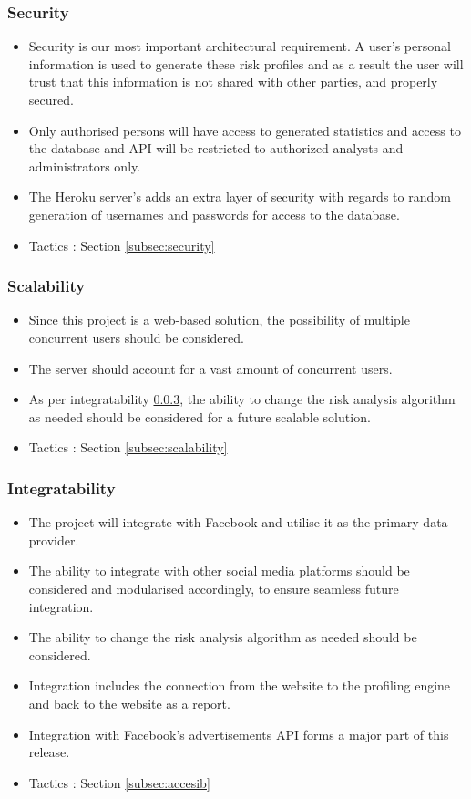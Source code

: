\documentclass{article}
\begin{document}
		\subsubsection{Security}\label{subsubsec:security}
		\begin{itemize}
			\item Security is our most important architectural requirement. A user's personal information is used to generate these risk profiles and as a result the user will trust that this information is not shared with other parties, and properly secured.
			\item Only authorised persons will have access to generated statistics and access to the database and API will be restricted to authorized analysts and administrators only.
			\item The Heroku server's adds an extra layer of security with regards to random generation of usernames and passwords for access to the database.
			\item Tactics : Section \ref{subsec:security}
		\end{itemize}
		\subsubsection{Scalability}
		\begin{itemize}
			\item Since this project is a web-based solution, the possibility of multiple concurrent users should be considered.
			\item The server should account for a vast amount of concurrent users.
			\item As per integratability \ref{subsubsec:integratability}, the ability to change the risk analysis algorithm as needed should be considered for a future scalable solution.
			\item Tactics : Section \ref{subsec:scalability}
		\end{itemize}

		\subsubsection{Integratability}\label{subsubsec:integratability}
		\begin{itemize}
			\item The project will integrate with Facebook and utilise it as the primary data provider.
			\item The ability to integrate with other social media platforms should be considered and modularised accordingly, to ensure seamless future integration.
			\item The ability to change the risk analysis algorithm as needed should be considered.
			\item Integration includes the connection from the website to the profiling engine and back to the website as a report.
			\item Integration with Facebook's advertisements API forms a major part of this release.
			\item Tactics : Section \ref{subsec:accesib}
		\end{itemize}
\end{document}
